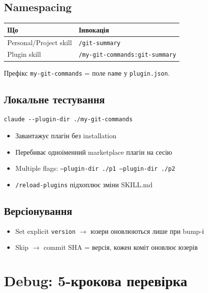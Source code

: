 \documentclass[11pt,a4paper]{article}
\begin{document}
\subsection{Namespacing}

\begin{tabular}{ll}
\hline
\textbf{Що} & \textbf{Інвокація} \\
\hline
Personal/Project skill & \texttt{/git-summary} \\
Plugin skill           & \texttt{/my-git-commands:git-summary} \\
\hline
\end{tabular}

Префікс \texttt{my-git-commands} = поле \texttt{name} у \texttt{plugin.json}.

\subsection{Локальне тестування}

\begin{lstlisting}
claude --plugin-dir ./my-git-commands
\end{lstlisting}

\begin{itemize}
\item Завантажує плагін без installation
\item Перебиває одноіменний marketplace плагін на сесію
\item Multiple flags: \texttt{--plugin-dir ./p1 --plugin-dir ./p2}
\item \texttt{/reload-plugins} підхоплює зміни SKILL.md
\end{itemize}

\subsection{Версіонування}

\begin{itemize}
\item Set explicit \texttt{version} $\to$ юзери оновлюються лише при bump-і
\item Skip $\to$ commit SHA = версія, кожен коміт оновлює юзерів
\end{itemize}

\section{Debug: 5-крокова перевірка}
\end{document}
